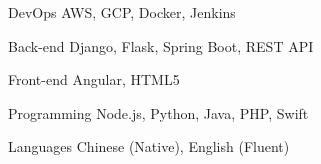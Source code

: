 

\begin{cvskills}

  \cvskill
    {DevOps} %
    {AWS, GCP, Docker, Jenkins} %

  \cvskill
    {Back-end} %
    {Django, Flask, Spring Boot, REST API} %

  \cvskill
    {Front-end} %
    {Angular, HTML5} %

  \cvskill
    {Programming} %
    {Node.js, Python, Java, PHP, Swift} %

  \cvskill
    {Languages} %
    {Chinese (Native), English (Fluent)} %

\end{cvskills}
